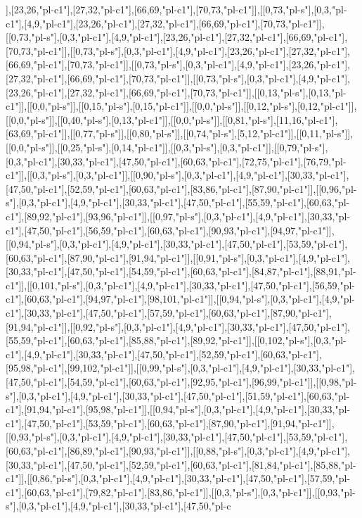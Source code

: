 ],[23,26,"pl-c1"],[27,32,"pl-c1"],[66,69,"pl-c1"],[70,73,"pl-c1"]],[[0,73,"pl-s"],[0,3,"pl-c1"],[4,9,"pl-c1"],[23,26,"pl-c1"],[27,32,"pl-c1"],[66,69,"pl-c1"],[70,73,"pl-c1"]],[[0,73,"pl-s"],[0,3,"pl-c1"],[4,9,"pl-c1"],[23,26,"pl-c1"],[27,32,"pl-c1"],[66,69,"pl-c1"],[70,73,"pl-c1"]],[[0,73,"pl-s"],[0,3,"pl-c1"],[4,9,"pl-c1"],[23,26,"pl-c1"],[27,32,"pl-c1"],[66,69,"pl-c1"],[70,73,"pl-c1"]],[[0,73,"pl-s"],[0,3,"pl-c1"],[4,9,"pl-c1"],[23,26,"pl-c1"],[27,32,"pl-c1"],[66,69,"pl-c1"],[70,73,"pl-c1"]],[[0,73,"pl-s"],[0,3,"pl-c1"],[4,9,"pl-c1"],[23,26,"pl-c1"],[27,32,"pl-c1"],[66,69,"pl-c1"],[70,73,"pl-c1"]],[[0,13,"pl-s"],[0,13,"pl-c1"]],[[0,0,"pl-s"]],[[0,15,"pl-s"],[0,15,"pl-c1"]],[[0,0,"pl-s"]],[[0,12,"pl-s"],[0,12,"pl-c1"]],[[0,0,"pl-s"]],[[0,40,"pl-s"],[0,13,"pl-c1"]],[[0,0,"pl-s"]],[[0,81,"pl-s"],[11,16,"pl-c1"],[63,69,"pl-c1"]],[[0,77,"pl-s"]],[[0,80,"pl-s"]],[[0,74,"pl-s"],[5,12,"pl-c1"]],[[0,11,"pl-s"]],[[0,0,"pl-s"]],[[0,25,"pl-s"],[0,14,"pl-c1"]],[[0,3,"pl-s"],[0,3,"pl-c1"]],[[0,79,"pl-s"],[0,3,"pl-c1"],[30,33,"pl-c1"],[47,50,"pl-c1"],[60,63,"pl-c1"],[72,75,"pl-c1"],[76,79,"pl-c1"]],[[0,3,"pl-s"],[0,3,"pl-c1"]],[[0,90,"pl-s"],[0,3,"pl-c1"],[4,9,"pl-c1"],[30,33,"pl-c1"],[47,50,"pl-c1"],[52,59,"pl-c1"],[60,63,"pl-c1"],[83,86,"pl-c1"],[87,90,"pl-c1"]],[[0,96,"pl-s"],[0,3,"pl-c1"],[4,9,"pl-c1"],[30,33,"pl-c1"],[47,50,"pl-c1"],[55,59,"pl-c1"],[60,63,"pl-c1"],[89,92,"pl-c1"],[93,96,"pl-c1"]],[[0,97,"pl-s"],[0,3,"pl-c1"],[4,9,"pl-c1"],[30,33,"pl-c1"],[47,50,"pl-c1"],[56,59,"pl-c1"],[60,63,"pl-c1"],[90,93,"pl-c1"],[94,97,"pl-c1"]],[[0,94,"pl-s"],[0,3,"pl-c1"],[4,9,"pl-c1"],[30,33,"pl-c1"],[47,50,"pl-c1"],[53,59,"pl-c1"],[60,63,"pl-c1"],[87,90,"pl-c1"],[91,94,"pl-c1"]],[[0,91,"pl-s"],[0,3,"pl-c1"],[4,9,"pl-c1"],[30,33,"pl-c1"],[47,50,"pl-c1"],[54,59,"pl-c1"],[60,63,"pl-c1"],[84,87,"pl-c1"],[88,91,"pl-c1"]],[[0,101,"pl-s"],[0,3,"pl-c1"],[4,9,"pl-c1"],[30,33,"pl-c1"],[47,50,"pl-c1"],[56,59,"pl-c1"],[60,63,"pl-c1"],[94,97,"pl-c1"],[98,101,"pl-c1"]],[[0,94,"pl-s"],[0,3,"pl-c1"],[4,9,"pl-c1"],[30,33,"pl-c1"],[47,50,"pl-c1"],[57,59,"pl-c1"],[60,63,"pl-c1"],[87,90,"pl-c1"],[91,94,"pl-c1"]],[[0,92,"pl-s"],[0,3,"pl-c1"],[4,9,"pl-c1"],[30,33,"pl-c1"],[47,50,"pl-c1"],[55,59,"pl-c1"],[60,63,"pl-c1"],[85,88,"pl-c1"],[89,92,"pl-c1"]],[[0,102,"pl-s"],[0,3,"pl-c1"],[4,9,"pl-c1"],[30,33,"pl-c1"],[47,50,"pl-c1"],[52,59,"pl-c1"],[60,63,"pl-c1"],[95,98,"pl-c1"],[99,102,"pl-c1"]],[[0,99,"pl-s"],[0,3,"pl-c1"],[4,9,"pl-c1"],[30,33,"pl-c1"],[47,50,"pl-c1"],[54,59,"pl-c1"],[60,63,"pl-c1"],[92,95,"pl-c1"],[96,99,"pl-c1"]],[[0,98,"pl-s"],[0,3,"pl-c1"],[4,9,"pl-c1"],[30,33,"pl-c1"],[47,50,"pl-c1"],[51,59,"pl-c1"],[60,63,"pl-c1"],[91,94,"pl-c1"],[95,98,"pl-c1"]],[[0,94,"pl-s"],[0,3,"pl-c1"],[4,9,"pl-c1"],[30,33,"pl-c1"],[47,50,"pl-c1"],[53,59,"pl-c1"],[60,63,"pl-c1"],[87,90,"pl-c1"],[91,94,"pl-c1"]],[[0,93,"pl-s"],[0,3,"pl-c1"],[4,9,"pl-c1"],[30,33,"pl-c1"],[47,50,"pl-c1"],[53,59,"pl-c1"],[60,63,"pl-c1"],[86,89,"pl-c1"],[90,93,"pl-c1"]],[[0,88,"pl-s"],[0,3,"pl-c1"],[4,9,"pl-c1"],[30,33,"pl-c1"],[47,50,"pl-c1"],[52,59,"pl-c1"],[60,63,"pl-c1"],[81,84,"pl-c1"],[85,88,"pl-c1"]],[[0,86,"pl-s"],[0,3,"pl-c1"],[4,9,"pl-c1"],[30,33,"pl-c1"],[47,50,"pl-c1"],[57,59,"pl-c1"],[60,63,"pl-c1"],[79,82,"pl-c1"],[83,86,"pl-c1"]],[[0,3,"pl-s"],[0,3,"pl-c1"]],[[0,93,"pl-s"],[0,3,"pl-c1"],[4,9,"pl-c1"],[30,33,"pl-c1"],[47,50,"pl-c